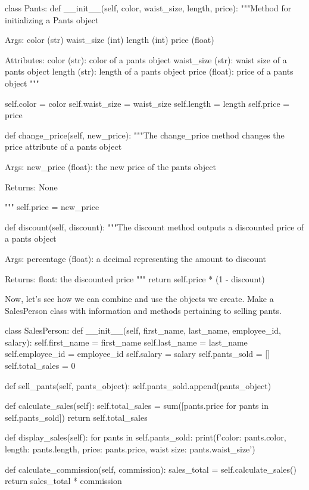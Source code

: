 \begin{python}
	class Pants:        
		def __init__(self, color, waist_size, length, price):
			"""Method for initializing a Pants object
			
			Args: 
			color (str)
			waist_size (int)
			length (int)
			price (float)
			
			Attributes:
			color (str): color of a pants object
			waist_size (str): waist size of a pants object
			length (str): length of a pants object
			price (float): price of a pants object
			"""
			
			self.color = color
			self.waist_size = waist_size
			self.length = length
			self.price = price
		
		def change_price(self, new_price):
			"""The change_price method changes the price attribute of a pants object
			
			Args: 
			new_price (float): the new price of the pants object
			
			Returns: None
			
			"""
			self.price = new_price
		
		def discount(self, discount):
			"""The discount method outputs a discounted price of a pants object
			
			Args:
			percentage (float): a decimal representing the amount to discount
			
			Returns:
			float: the discounted price
			"""
			return self.price * (1 - discount)
\end{python}

Now, let's see how we can combine and use the objects we create. Make a SalesPerson class with information and methods pertaining to selling pants.
\begin{python}
	class SalesPerson:
		def __init__(self, first_name, last_name, employee_id, salary):
			self.first_name = first_name
			self.last_name = last_name
			self.employee_id = employee_id
			self.salary = salary
			self.pants_sold = []
			self.total_sales = 0
		
		def sell_pants(self, pants_object):
			self.pants_sold.append(pants_object)
		
		def calculate_sales(self):
			self.total_sales = sum([pants.price for pants in self.pants_sold])
			return self.total_sales
		
		def display_sales(self):
			for pants in self.pants_sold:
			print(f'color: {pants.color}, length: {pants.length}, price: {pants.price}, waist size: {pants.waist_size}')
		
		def calculate_commission(self, commission):
			sales_total = self.calculate_sales()
			return sales_total * commission
\end{python}

